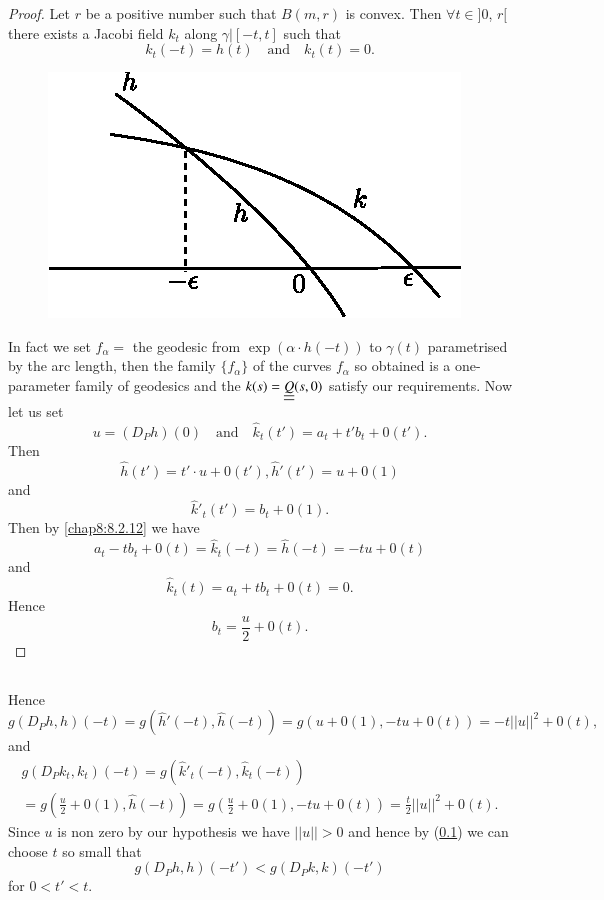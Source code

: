 \begin{proof}
Let $r$ be a positive number such that $B(m,r)$ is convex. Then
$\forall t\in ]0$, $r[$ there exists a Jacobi field $k_{t}$ along
    $\gamma|[-t,t]$ such that
\begin{equation*}
k_{t}(-t)=h(t)\quad\text{and}\quad k_{t}(t)=0.\tag{8.2.12}\label{chap8:8.2.12}
\end{equation*}
\begin{figure}[H]
\centering
\includegraphics{figures/chap8-fig1.eps}
\end{figure}

In fact we set $f_{\alpha}=$ the geodesic from $\exp(\alpha\cdot
h(-t))$ to $\gamma(t)$ parametri\-sed by the arc length, then the family
$\{f_{\alpha}\}$ of the curves $f_{\alpha}$ so obtained is a
one-parameter family of geodesics and the $k(s)=\underline{\underline{Q}}(s,0)$ satisfy
our requirements. Now let us set
$$
u=(D_{P}h)(0)\quad\text{and}\quad \widehat{k}_{t}(t')=a_{t}+t'b_{t}+0(t').
$$
Then
$$
\widehat{h}(t')=t'\cdot u+0(t'),\widehat{h}'(t')=u+0(1)
$$
and 
$$
\widehat{k}'_{t}(t')=b_{t}+0(1).
$$
Then by \eqref{chap8:8.2.12} we have
$$
a_{t}-tb_{t}+0(t)=\widehat{k}_{t}(-t)=\widehat{h}(-t)=-tu+0(t)
$$
and
$$
\widehat{k}_{t}(t)=a_{t}+tb_{t}+0(t)=0.
$$
Hence\pageoriginale
$$
b_{t}=\frac{u}{2}+0(t).
$$
\end{proof}
 
\setcounter{subsection}{12}
\subsection{}\label{chap8:8.2.13}
Hence
$$
g(D_{P}h,h)(-t)=g(\widehat{h}'(-t),\widehat{h}(-t))=g(u+0(1),-tu+0(t))=-t||u||^{2}+0(t), 
$$
and
\begin{gather*}
g(D_{P}k_{t},k_{t})(-t)=g(\widehat{k}'_{t}(-t),\widehat{k}_{t}(-t))\\
=g\left(\frac{u}{2}+0(1),
\widehat{h}(-t)\right)=g\left(\frac{u}{2}+0(1),
-tu+0(t)\right)=\frac{t}{2}||u||^{2}+0(t). 
\end{gather*}
Since $u$ is non zero by our hypothesis we have $||u||>0$ and hence by
(\ref{chap8:8.2.13}) we can choose $t$ so small that
$$
g(D_{P}h,h)(-t')<g(D_{P}k,k)(-t')
$$
for $0<t'<t$.

